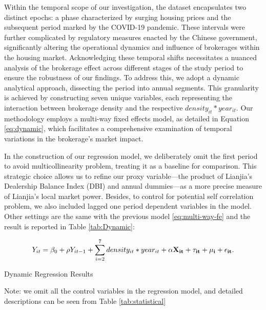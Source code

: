 \documentclass[12pt]{article}
\begin{document}
Within the temporal scope of our investigation, the dataset encapsulates two distinct epochs: a phase characterized by surging housing prices and the subsequent period marked by the COVID-19 pandemic. These intervals were further complicated by regulatory measures enacted by the Chinese government, significantly altering the operational dynamics and influence of brokerages within the housing market. Acknowledging these temporal shifts necessitates a nuanced analysis of the brokerage effect across different stages of the study period to ensure the robustness of our findings. To address this, we adopt a dynamic analytical approach, dissecting the period into annual segments. This granularity is achieved by constructing seven unique variables, each representing the interaction between brokerage density and the respective $density_{it} * year_{it}$. Our methodology employs a multi-way fixed effects model, as detailed in Equation \eqref{eq:dynamic}, which facilitates a comprehensive examination of temporal variations in the brokerage's market impact.

In the construction of our regression model, we deliberately omit the first period to avoid multicollinearity problem, treating it as a baseline for comparison. This strategic choice allows us to refine our proxy variable—the product of Lianjia's Dealership Balance Index (DBI) and annual dummies—as a more precise measure of Lianjia's local market power. Besides, to control for potential self correlation problem, we also included lagged one period dependent variables in the model.  Other settings are the same with the previous model \eqref{eq:multi-way-fe} and the result is reported in Table \ref{tab:Dynamic}: 

\begin{equation}
    Y_{it} = \beta_0 + \rho Y_{it-1} + \sum_{i=2}^7 density_{it} * year_{it} + \bf{\alpha} \bf{X}_{it} + \tau_{it} + \mu_i + \epsilon_{it}. \label{eq:dynamic}
\end{equation}

\begin{table}[H]
  \begin{center}
    \begin{scriptsize}
    \caption{Dynamic Regression Results}
    \label{tab:Dynamic}
    

    Note: we omit all the control variables in the regression model, and detailed descriptions can be seen from Table \ref{tab:statistical}
    \end{scriptsize}
  \end{center}
\end{table}
\end{document}
